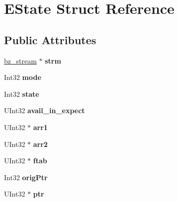 \hypertarget{struct_e_state}{}\section{E\+State Struct Reference}
\label{struct_e_state}
\subsection*{Public Attributes}
\begin{DoxyCompactItemize}
\item 
\hyperlink{structbz__stream}{bz\+\_\+stream} $\ast$ {\bfseries strm}\hypertarget{struct_e_state_a7063b24558691ab4405a034558ca0780}{}\label{struct_e_state_a7063b24558691ab4405a034558ca0780}

\item 
Int32 {\bfseries mode}\hypertarget{struct_e_state_aa8bcff8ad3c08aa1d4104f3a1f98675e}{}\label{struct_e_state_aa8bcff8ad3c08aa1d4104f3a1f98675e}

\item 
Int32 {\bfseries state}\hypertarget{struct_e_state_a103955affd2678bb4be0b7d272cea6d8}{}\label{struct_e_state_a103955affd2678bb4be0b7d272cea6d8}

\item 
U\+Int32 {\bfseries avail\+\_\+in\+\_\+expect}\hypertarget{struct_e_state_a2c253cc7ac4cb5906bfa27a95f9d8f40}{}\label{struct_e_state_a2c253cc7ac4cb5906bfa27a95f9d8f40}

\item 
U\+Int32 $\ast$ {\bfseries arr1}\hypertarget{struct_e_state_a913260bad0cf37079a08b9a133293aaa}{}\label{struct_e_state_a913260bad0cf37079a08b9a133293aaa}

\item 
U\+Int32 $\ast$ {\bfseries arr2}\hypertarget{struct_e_state_ae482d96bff0988edaf4422eef4a7050c}{}\label{struct_e_state_ae482d96bff0988edaf4422eef4a7050c}

\item 
U\+Int32 $\ast$ {\bfseries ftab}\hypertarget{struct_e_state_a28875568269ede0a2e40d6ec21636113}{}\label{struct_e_state_a28875568269ede0a2e40d6ec21636113}

\item 
Int32 {\bfseries orig\+Ptr}\hypertarget{struct_e_state_ae5f37ef91f4b3a4165f99a7444eeae6f}{}\label{struct_e_state_ae5f37ef91f4b3a4165f99a7444eeae6f}

\item 
U\+Int32 $\ast$ {\bfseries ptr}\hypertarget{struct_e_state_a6d014c56a52f7f0a4c680ddbae266577}{}\label{struct_e_state_a6d014c56a52f7f0a4c680ddbae266577}


\end{DoxyCompactItemize}
